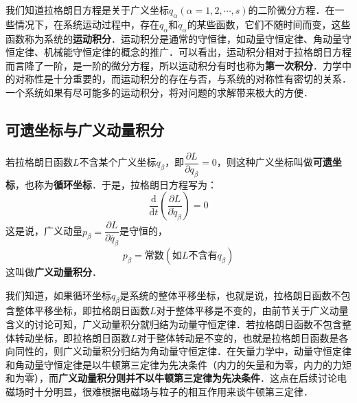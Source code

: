 

我们知道拉格朗日方程是关于广义坐标$q_\alpha(\alpha=1,2,\cdots,s)$的二阶微分方程．在一些情况下，在系统运动过程中，存在$q_\alpha$和$\dot{q}_\alpha$的某些函数，它们不随时间而变，这些函数称为系统的\textbf{运动积分}．运动积分是通常的守恒律，如动量守恒定律、角动量守恒定律、机械能守恒定律的概念的推广．可以看出，运动积分相对于拉格朗日方程而言降了一阶，是一阶的微分方程，所以运动积分有时也称为\textbf{第一次积分}．力学中的对称性是十分重要的，而运动积分的存在与否，与系统的对称性有密切的关系．一个系统如果有尽可能多的运动积分，将对问题的求解带来极大的方便．

\subsection{可遗坐标与广义动量积分}

若拉格朗日函数$L$不含某个广义坐标$q_\beta$，即$\dfrac{\partial L}{\partial q_\beta}=0$，则这种广义坐标叫做\textbf{可遗坐标}，也称为\textbf{循环坐标}．于是，拉格朗日方程写为：
\begin{equation}
\frac{\mathrm{d}}{\mathrm{d} t}\left(\frac{\partial L}{\partial \dot{q}_{\beta}}\right)=0
\end{equation}
这是说，广义动量$p_\beta=\dfrac{\partial L} {\partial \dot{q_\beta}}$是守恒的，
\begin{equation}
p_\beta=常数(如L不含有q_\beta)
\end{equation}
这叫做\textbf{广义动量积分}．

我们知道，如果循环坐标$q_\beta$是系统的整体平移坐标，也就是说，拉格朗日函数不包含整体平移坐标，即拉格朗日函数$L $对于整体平移是不变的，由前节关于广义动量含义的讨论可知，广义动量积分就归结为动量守恒定律．若拉格朗日函数不包含整体转动坐标，即拉格朗日函数$L$对于整体转动是不变的，也就是拉格朗日函数是各向同性的，则广义动量积分归结为角动量守恒定律．在矢量力学中，动量守恒定律和角动量守恒定律是以牛顿第三定律为先决条件（内力的矢量和为零，内力的力矩和为零），而\textbf{广义动量积分则并不以牛顿第三定律为先决条件}．这点在后续讨论电磁场时十分明显，很难根据电磁场与粒子的相互作用来谈牛顿第三定律．

